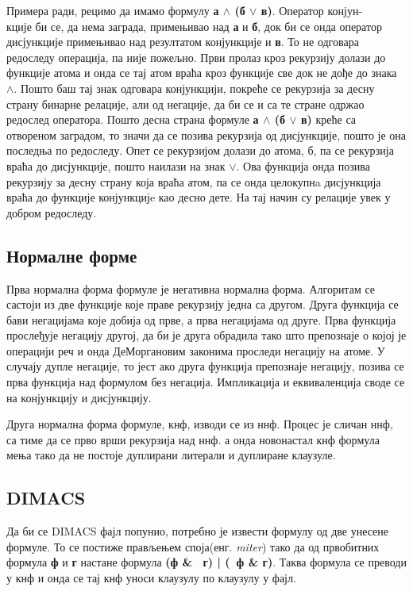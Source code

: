 \documentclass[a4paper,10pt]{article}
\begin{document}
Примера ради, рецимо да имамо формулу \textbf{а $\land$ (б $\lor$ в)}. Оператор конјун-\\кције би се, да нема заграда, примењивао над \textbf{а} и \textbf{б}, док би се онда оператор дисјункције примењивао над резултатом конјункције и \textbf{в}. То не одговара редоследу операција, па није пожељно. Први пролаз кроз рекурзију долази до функције атома и онда се тај атом враћа кроз функције све док не дође до знака $\land$. Пошто баш тај знак одговара конјункцији, покреће се рекурзија за десну страну бинарне релације, али од негације, да би се и са те стране одржао редослед оператора. Пошто десна страна формуле \textbf{а $\land$ (б $\lor$ в)} креће са отвореном заградом, то значи да се позива рекурзија од дисјункције, пошто је она последња по редоследу. Опет се рекурзијом долази до атома, б, па се рекурзија враћа до дисјункције, пошто наилази на знак $\lor$. Ова функција онда позива рекурзију за десну страну која враћа атом, па се онда целокупнa дисјункција враћа до функције конјункцијe као десно дете. На тај начин су релације увек у добром редоследу.

\subsection{Нормалне форме}
Прва нормална форма формуле је негативна нормална форма. Алгоритам се састоји из две функције које праве рекурзију једна са другом. Друга функција се бави негацијама које добија од прве, а прва негацијама од друге. Прва функција прослеђује негацију другој, да би је друга обрадила тако што препознаје о којој је операцији реч и онда ДеМоргановим законима проследи негацију на атоме. У случају дупле негације, то јест ако друга функција препознаје негацију, позива се прва функција над формулом без негација. Импликација и еквиваленција своде се на конјункцију и дисјункцију.

Друга нормална форма формуле, кнф, изводи се из ннф. Процес је сличан ннф, са тиме да се прво врши рекурзија над ннф. а онда новонастал кнф формула мења тако да не постоје дуплирани литерали и дуплиране клаузуле.

\subsection{DIMACS}
Да би се DIMACS фајл попунио, потребно је извести формулу од две унесене формуле. То се постиже прављењем споја(енг. \textit{miter}) тако да од првобитних формула \textbf{ф} и \textbf{г} настане формула \textbf{(ф \& ~г) | (~ф \& г)}. Таква формула се преводи у кнф и онда се тај кнф уноси клаузулу по клаузулу у фајл.
\end{document}
